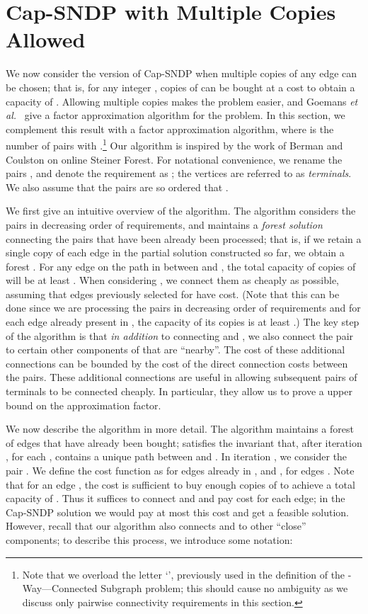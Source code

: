 \documentclass[11pt]{article}
\newcounter{thm0Rcopies}
\newcounter{thm_saved}
\newcommand{\etal}{{\em et al.}\ }
\def\kway{-Way---Connected Subgraph\xspace}
\begin{document}
\section{Cap-SNDP with Multiple Copies Allowed} \label{sec:multipleCopies}

We now consider the version of Cap-SNDP when multiple copies of any
edge  can be chosen; that is, for any integer ,
 copies of  can be bought at a cost  to
obtain a capacity of .  Allowing multiple copies
makes the problem easier, and Goemans \etal \cite{GG+} give a  factor approximation algorithm for the problem.  In this
section, we complement this result with a  factor
approximation algorithm, where  is the number of  pairs with
.\footnote{Note that we overload the letter `',
  previously used in the definition of the \kway problem; this should
  cause no ambiguity as we discuss only pairwise connectivity
  requirements in this section.} Our algorithm is inspired by the work
of Berman and Coulston \cite{BC} on online Steiner Forest.  For
notational convenience, we rename the pairs , and denote the requirement  as ; the
vertices  are referred to as \emph{terminals}. We also
assume that the pairs are so ordered that .

We first give an intuitive overview of the algorithm. The algorithm
considers the pairs in decreasing order of requirements, and maintains
a \emph{forest solution} connecting the pairs that have been already
been processed; that is, if we retain a single copy of each edge in
the partial solution constructed so far, we obtain a forest . For
any edge  on the path in  between  and , the total
capacity of copies of  will be at least . When considering
, we connect them as cheaply as possible, assuming that
edges previously selected for  have  cost. (Note that this can
be done since we are processing the pairs in decreasing order of
requirements and for each edge already present in , the capacity of
its copies is at least .) The key step of the algorithm is that
\emph{in addition} to connecting  and , we also connect the
pair to certain other components of  that are ``nearby''.  The cost
of these additional connections can be bounded by the cost of the
direct connection costs between the pairs. These additional
connections are useful in allowing subsequent pairs of terminals to be
connected cheaply. In particular, they allow us to prove a 
upper bound on the approximation factor.

We now describe the algorithm in more detail. The algorithm maintains
a forest  of edges that have already been bought;  satisfies the
invariant that, after iteration , for each , 
contains a unique path between  and . In iteration , we
consider the pair .  We define the cost function  as
 for edges  already in , and , for edges . Note that for an edge
, the cost  is sufficient to buy enough copies of
 to achieve a total capacity of . Thus it suffices to connect
 and  and pay cost  for each edge; in the Cap-SNDP
solution we would pay at most this cost and get a feasible solution.
However, recall that our algorithm also connects  and  to 
other ``close'' components; to describe this process, we introduce
some notation:
\end{document}

